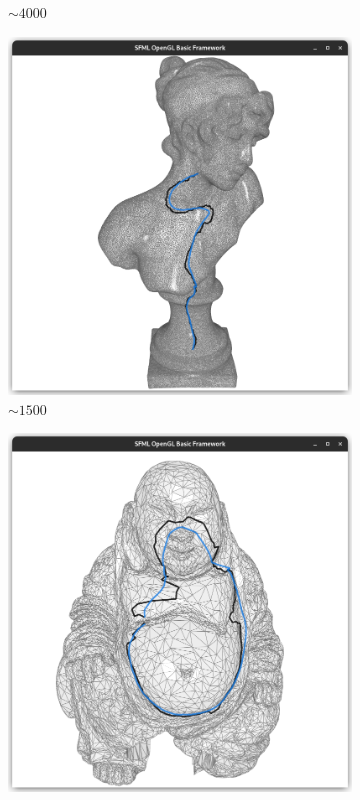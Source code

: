 \documentclass{stdlocal}
\begin{document}
\begin{figure}
\begin{subfigure}[b]{0.24\linewidth}
    \caption{$\sim 4000$}
  \end{subfigure}
  \begin{subfigure}[b]{0.24\linewidth}
    \centering
    \includegraphics[width=\linewidth,trim={15px 20 15 50},clip]{images/sappho-smooth-0.5.png}
    \caption{$\sim 1500$}
  \end{subfigure}
  \begin{subfigure}[b]{0.24\linewidth}
    \centering
    \includegraphics[width=\linewidth,trim={15px 20 15 50},clip]{images/buddha-smooth-0.5.png}

\end{subfigure}
\end{figure}
\end{document}
